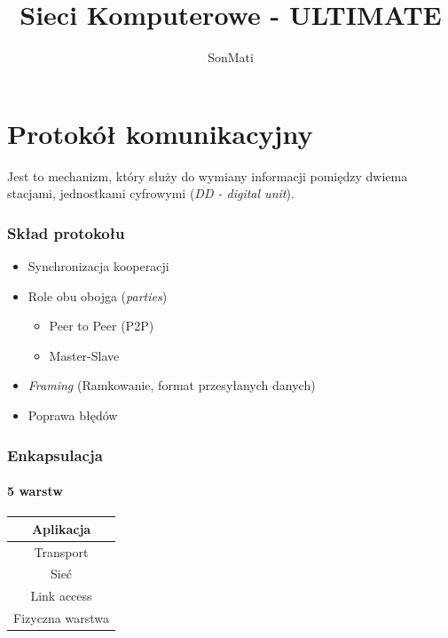 \documentclass[a4paper,twoside]{article}
\begin{document}




\begin{titlepage}
\title{\huge Sieci Komputerowe - ULTIMATE}
\author{\large SonMati}
\maketitle
\end{titlepage}

\newpage

\part{Protokół komunikacyjny}
Jest to mechanizm, który służy do wymiany informacji pomiędzy dwiema stacjami, jednostkami cyfrowymi (\emph{DD - digital unit}). 
\section{Skład protokołu}
\begin{itemize}
	\item Synchronizacja kooperacji
	\item Role obu obojga (\emph{parties})
	\begin{itemize}
		\item Peer to Peer (P2P)
		\item Master-Slave
	\end{itemize}
	\item \emph{Framing} (Ramkowanie, format przesyłanych danych)
	\item Poprawa błędów
\end{itemize}
\section{Enkapsulacja}
	\subsection{5 warstw}
	\begin{table}[h]
		\begin{tabular}{|c|}
			\hline
			Aplikacja        \\ \hline
			Transport        \\ \hline
			Sieć             \\ \hline
			Link access      \\ \hline
			Fizyczna warstwa \\ \hline
		\end{tabular}
	\end{table}
\end{document}
